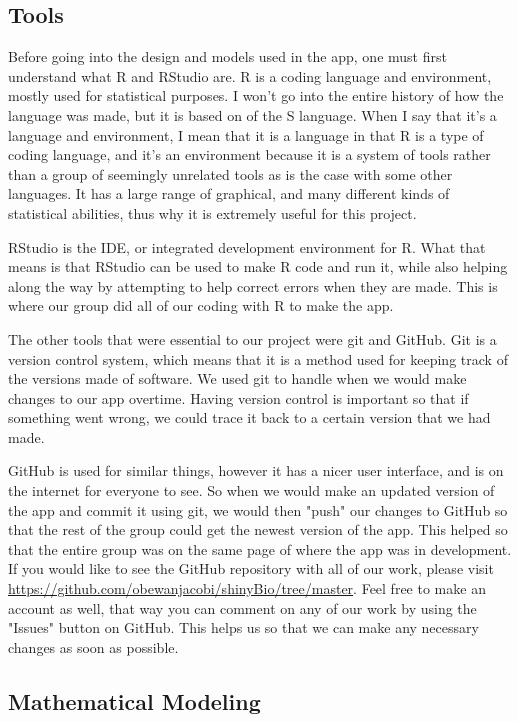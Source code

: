 \documentclass[titlepage]{article}\usepackage[]{graphicx}\usepackage[]{color}
\begin{document}
\subsection{Tools}

Before going into the design and models used in the app, one must first understand what R and RStudio are. R is a coding language and environment, mostly used for statistical purposes. I won't go into the entire history of how the language was made, but it is based on of the S language. When I say that it's a language and environment, I mean that it is a language in that R is a type of coding language, and it's an environment because it is a system of tools rather than a group of seemingly unrelated tools as is the case with some other languages. It has a large range of graphical, and many different kinds of statistical abilities, thus why it is extremely useful for this project.

RStudio is the IDE, or integrated development environment for R. What that means is that RStudio can be used to make R code and run it, while also helping along the way by attempting to help correct errors when they are made. This is where our group did all of our coding with R to make the app. 

The other tools that were essential to our project were git and GitHub. Git is a version control system, which means that it is a method used for keeping track of the versions made of software. We used git to handle when we would make changes to our app overtime. Having version control is important so that if something went wrong, we could trace it back to a certain version that we had made. 

GitHub is used for similar things, however it has a nicer user interface, and is on the internet for everyone to see. So when we would make an updated version of the app and commit it using git, we would then "push" our changes to GitHub so that the rest of the group could get the newest version of the app. This helped so that the entire group was on the same page of where the app was in development. If you would like to see the GitHub repository with all of our work, please visit \url{https://github.com/obewanjacobi/shinyBio/tree/master}. Feel free to make an account as well, that way you can comment on any of our work by using the "Issues" button on GitHub. This helps us so that we can make any necessary changes as soon as possible.






\subsection{Mathematical Modeling}
\end{document}
